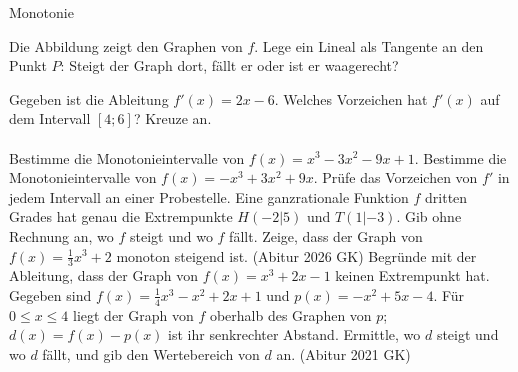\setcounter{aufgabe}{8}

\begin{aufgabe}{Monotonie}
\begin{teile}
\teil Die Abbildung zeigt den Graphen von $f$. Lege ein Lineal als Tangente an den Punkt $P$: Steigt der Graph dort, fällt er oder ist er waagerecht? \\   

\begin{ksys}[xmin=-3,xmax=3,ymin=-3,ymax=3,ablesen]   \end{ksys}
\teil Gegeben ist die Ableitung $f'(x) = 2x - 6$. Welches Vorzeichen hat $f'(x)$ auf dem Intervall $[4; 6]$? Kreuze an. \\  \\ 
\teil Bestimme die Monotonieintervalle von $f(x) = x^3 - 3x^2 - 9x + 1$.
\teil Bestimme die Monotonieintervalle von $f(x) = -x^3 + 3x^2 + 9x$. Prüfe das Vorzeichen von $f'$ in jedem Intervall an einer Probestelle.
\teil Eine ganzrationale Funktion $f$ dritten Grades hat genau die Extrempunkte $H(-2 | 5)$ und $T(1 | -3)$. Gib ohne Rechnung an, wo $f$ steigt und wo $f$ fällt.
\teil Zeige, dass der Graph von $f(x) = \frac{1}{3}x^3 + 2$ monoton steigend ist. \hfill (Abitur 2026 GK)
\teil Begründe mit der Ableitung, dass der Graph von $f(x) = x^3 + 2x - 1$ keinen Extrempunkt hat.
\teil Gegeben sind $f(x) = \frac{1}{4}x^3 - x^2 + 2x + 1$ und $p(x) = -x^2 + 5x - 4$. Für $0 \le x \le 4$ liegt der Graph von $f$ oberhalb des Graphen von $p$; $d(x) = f(x) - p(x)$ ist ihr senkrechter Abstand. Ermittle, wo $d$ steigt und wo $d$ fällt, und gib den Wertebereich von $d$ an. \hfill (Abitur 2021 GK)
\end{teile}
\end{aufgabe}

